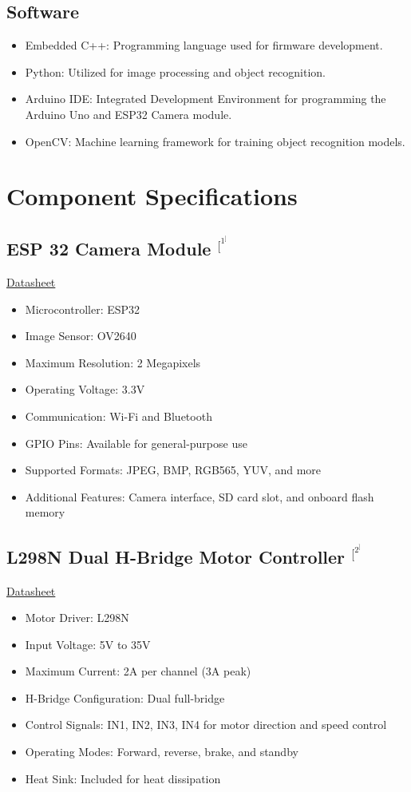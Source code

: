 \documentclass[a4paper,12pt,oneside]{book}
\begin{document}
\subsection{Software}
\begin{itemize}
  \item Embedded C++: Programming language used for firmware development.
  \item Python: Utilized for image processing and object recognition.
  \item Arduino IDE: Integrated Development Environment for programming the Arduino Uno and ESP32 Camera module.
  \item OpenCV: Machine learning framework for training object recognition models.
\end{itemize}

\section*{Component Specifications}


\subsection*{ESP 32 Camera Module $^[^1^]$}
\href{https://media.digikey.com/pdf/Data%20Sheets/DFRobot%20PDFs/DFR0602_Web.pdf}{Datasheet}
\begin{itemize}
  \item Microcontroller: ESP32
  \item Image Sensor: OV2640
  \item Maximum Resolution: 2 Megapixels
  \item Operating Voltage: 3.3V
  \item Communication: Wi-Fi and Bluetooth
  \item GPIO Pins: Available for general-purpose use
  \item Supported Formats: JPEG, BMP, RGB565, YUV, and more
  \item Additional Features: Camera interface, SD card slot, and onboard flash memory
\end{itemize}

\subsection*{L298N Dual H-Bridge Motor Controller $^[^2^]$}
\href{https://www.etechnophiles.com/l298n-motor-driver-pin-diagram/}{Datasheet}
\begin{itemize}
  \item Motor Driver: L298N
  \item Input Voltage: 5V to 35V
  \item Maximum Current: 2A per channel (3A peak)
  \item H-Bridge Configuration: Dual full-bridge
  \item Control Signals: IN1, IN2, IN3, IN4 for motor direction and speed control
  \item Operating Modes: Forward, reverse, brake, and standby
  \item Heat Sink: Included for heat dissipation
\end{itemize}
\end{document}
